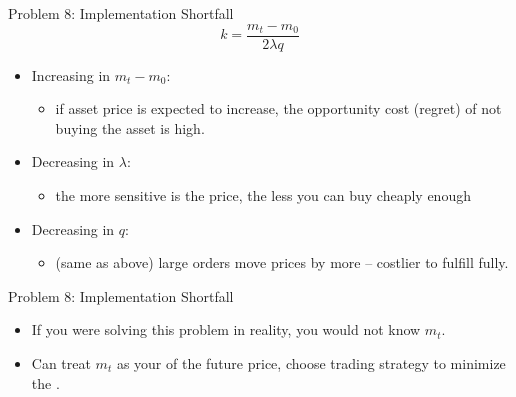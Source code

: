 \documentclass[english,10pt]{beamer}
\theoremstyle{definition}
\begin{document}
\begin{frame}{Problem 8: Implementation Shortfall}
	$$ k = \frac{m_t - m_0}{2\lambda q} $$
	\begin{itemize}
		\item Increasing in $m_t - m_0$:
		\begin{itemize}
			\item if asset price is expected to increase, the opportunity cost (regret) of not buying the asset is high.
		\end{itemize}
		\item Decreasing in $\lambda$:
		\begin{itemize}
			\item the more sensitive is the price, the less you can buy cheaply enough
		\end{itemize}
		\item Decreasing in $q$:
		\begin{itemize}
			\item (same as above) large orders move prices by more -- costlier to fulfill fully.
		\end{itemize}
	\end{itemize}
\end{frame}


\begin{frame}{Problem 8: Implementation Shortfall}
	\begin{itemize}
		\item If you were solving this problem in reality, you would not know $m_t$.
		\item Can treat $m_t$ as your  of the future price, choose trading strategy to minimize the .
	\end{itemize}
\end{frame}
\end{document}
